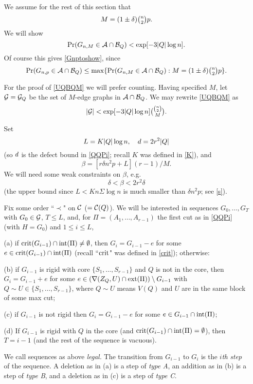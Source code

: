 \documentclass[letterpaper,11pt]{article}
\newcommand{\beq}[1]{\begin{equation}\label{#1}}
\newcommand{\enq}[0]{\end{equation}}
\newcommand{\mn}[0]{\medskip\noindent}
\newcommand{\sm}[0]{\setminus}
\renewcommand{\dots}[0]{,\ldots,}
\newcommand{\A}[0]{{\cal A}}
\newcommand{\B}[0]{{\cal B}}
\newcommand{\cee}[0]{{\cal C}}
\newcommand{\g}[0]{{\cal G}}
\newcommand{\inte}[0]{{\rm int}}
\newcommand{\crit}[0]{{\rm crit}}
\newcommand{\ext}[0]{{\rm ext}}
\newcommand{\0}[0]{\emptyset}
\newcommand{\C}[2]{{{#1}\choose{{#2}}}}
\newcommand{\Cc}[0]{\tbinom}
\newcommand{\gb}[0]{\beta }
\newcommand{\gd}[0]{\delta }
\newcommand{\gS}[0]{\Sigma}
\begin{document}
\medskip
We assume for the rest of this section that
\beq{Mbig}
M=(1\pm\gd)\Cc{n}{2}p.
\enq
We will show
%
\beq{UQBQM}
\Pr(G_{n,M}\in \A\cap\B_Q) < \exp [-3|Q|\log n].
\enq
Of course this gives \eqref{Gnptoshow}, since
\beq{transfer2'}
\Pr(G_{n,p}\in \A\cap\B_Q)
\leq \max\{\Pr(G_{n,M}\in \A\cap\B_Q):M= (1\pm \gd)\Cc{n}{2}p\}.
\enq



\medskip
For the proof of \eqref{UQBQM}
we will prefer counting.  Having specified $M$,
let $\g=\g_Q$ be the set of $M$-edge graphs in $\A\cap \B_Q$.
We may rewrite \eqref{UQBQM}
as
\beq{GnMtoshow'}
|\g|< \exp [-3|Q|\log n]\Cc{\C{n}{2}}{M}.
\enq


\medskip
Set
\beq{Ld}
L=K |Q| \log n,  ~~~
\qq= 2r^2|Q|
\enq
(so $d$ is the defect bound in \eqref{QQPi};
recall $K$ was defined in \eqref{K}), and
\beq{gb}
\gb =[r\gd n^2p +L](r-1)/M.
\enq
We will need some weak constraints on $\gb$, e.g.
\beq{gbsmall}
\gd < \gb < 2r^2 \gd
\enq
(the upper bound since $L< Kn\gS \log n $ is much smaller than $\gd n^2p $;
see \eqref{s}).



\medskip
Fix some order
``$\prec$" on $\cee$ ($=\cee(Q)$).
We will be interested in sequences
$G_0\dots G_T$ with $G_0\in \g$,
$T\leq L$, and, for
$\Pi=(A_1\dots A_{r-1})$
the first cut as in \eqref{QQPi} (with $H=G_0$) and
$1\leq i\leq L$,




\mn
(a)  if $\crit(G_{i-1})\cap \inte(\Pi)\neq\0$, then $G_i=G_{i-1}-e$
for some $e\in \crit(G_{i-1})\cap \inte(\Pi)$
(recall ``$\crit$" was defined in \eqref{crit}); otherwise:


\mn
(b)  if $G_{i-1}$ is rigid with core
$\{S_1\dots S_{r-1}\}$ and $Q$
is not in the core, then
$G_i=G_{i-1}+e$
for some $e\in (\nabla(Z_Q,U)\cap\ext(\Pi))\sm G_{i-1}$
with $Q\sim U\in \{S_1\dots S_{r-1}\}$,
where
$Q\sim U$ means $V(Q)$ and $U$ are in the same
block of some max cut;

\mn
(c)  if $G_{i-1}$ is not rigid then
$G_i=G_{i-1}-e$
for some $e\in G_{i-1}\cap\inte(\Pi)$;



\mn
(d)  If
$G_{i-1}$ is rigid
with $Q$ in the core
(and $\crit(G_{i-1})\cap \inte(\Pi)=\0$), then $T=i-1$
(and the rest of the sequence is vacuous).





\medskip
We call sequences as above {\em legal.}
The transition from $G_{i-1}$ to $G_i$ is
the {\em $i$th step} of the sequence.
A deletion as in (a) is a step of {\em type A},
an addition as in (b) is a step of {\em type B},
and a deletion as in (c) is a step of {\em type C}.
\end{document}
